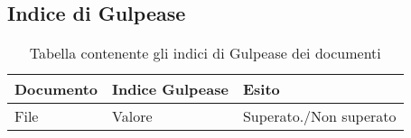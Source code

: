 \subsection{Indice di Gulpease}
{

\centering
\renewcommand{\arraystretch}{2}
\begin{longtable}{C{6cm} C{4.7cm} C{4cm}}
\caption{Tabella contenente gli indici di Gulpease dei documenti}\\
\textbf{Documento} &
\textbf{Indice Gulpease}&
\textbf{Esito}\\
\endhead

File & Valore & Superato./Non superato\\

\end{longtable}


}